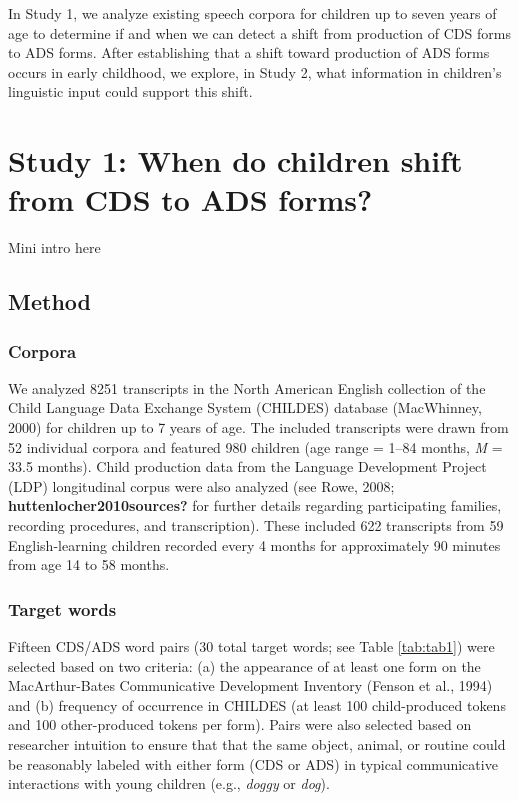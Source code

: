 \documentclass[10pt, letterpaper]{article}
\begin{document}
In Study 1, we analyze existing speech corpora for children up to seven
years of age to determine if and when we can detect a shift from
production of CDS forms to ADS forms. After establishing that a shift
toward production of ADS forms occurs in early childhood, we explore, in
Study 2, what information in children's linguistic input could support
this shift.

\hypertarget{study-1-when-do-children-shift-from-cds-to-ads-forms}{%
\section{Study 1: When do children shift from CDS to ADS
forms?}\label{study-1-when-do-children-shift-from-cds-to-ads-forms}}

Mini intro here

\hypertarget{method}{%
\subsection{Method}\label{method}}

\hypertarget{corpora}{%
\subsubsection{Corpora}\label{corpora}}

We analyzed 8251 transcripts in the North American English collection of
the Child Language Data Exchange System (CHILDES) database (MacWhinney,
2000) for children up to 7 years of age. The included transcripts were
drawn from 52 individual corpora and featured 980 children (age range =
1--84 months, \emph{M} = 33.5 months). Child production data from the
Language Development Project (LDP) longitudinal corpus were also
analyzed (see Rowe, 2008; \textbf{huttenlocher2010sources?} for further
details regarding participating families, recording procedures, and
transcription). These included 622 transcripts from 59 English-learning
children recorded every 4 months for approximately 90 minutes from age
14 to 58 months.

\hypertarget{target-words}{%
\subsubsection{Target words}\label{target-words}}

Fifteen CDS/ADS word pairs (30 total target words; see Table
\ref{tab:tab1}) were selected based on two criteria: (a) the appearance
of at least one form on the MacArthur-Bates Communicative Development
Inventory (Fenson et al., 1994) and (b) frequency of occurrence in
CHILDES (at least 100 child-produced tokens and 100 other-produced
tokens per form). Pairs were also selected based on researcher intuition
to ensure that that the same object, animal, or routine could be
reasonably labeled with either form (CDS or ADS) in typical
communicative interactions with young children (e.g., \emph{doggy} or
\emph{dog}).
\end{document}
